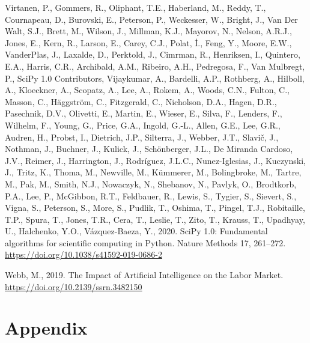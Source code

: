 \documentclass[
  11,
  a4paperpaper,
]{article}
\newlength{\cslhangindent}
\newenvironment{CSLReferences}[2] %
 {\begin{list}{}{%
  \setlength{\itemindent}{0pt}
  \setlength{\leftmargin}{0pt}
  \setlength{\parsep}{0pt}
  \ifodd #1
   \setlength{\leftmargin}{\cslhangindent}
   \setlength{\itemindent}{-1\cslhangindent}
  \fi
  \setlength{\itemsep}{#2\baselineskip}}}
 {\end{list}}
\let\oldsection\section
\renewcommand\section{\clearpage\oldsection}
\begin{document}
\begin{CSLReferences}{1}{0}
Virtanen, P., Gommers, R., Oliphant, T.E., Haberland, M., Reddy, T.,
Cournapeau, D., Burovski, E., Peterson, P., Weckesser, W., Bright, J.,
Van Der Walt, S.J., Brett, M., Wilson, J., Millman, K.J., Mayorov, N.,
Nelson, A.R.J., Jones, E., Kern, R., Larson, E., Carey, C.J., Polat, İ.,
Feng, Y., Moore, E.W., VanderPlas, J., Laxalde, D., Perktold, J.,
Cimrman, R., Henriksen, I., Quintero, E.A., Harris, C.R., Archibald,
A.M., Ribeiro, A.H., Pedregosa, F., Van Mulbregt, P., SciPy 1.0
Contributors, Vijaykumar, A., Bardelli, A.P., Rothberg, A., Hilboll, A.,
Kloeckner, A., Scopatz, A., Lee, A., Rokem, A., Woods, C.N., Fulton, C.,
Masson, C., Häggström, C., Fitzgerald, C., Nicholson, D.A., Hagen, D.R.,
Pasechnik, D.V., Olivetti, E., Martin, E., Wieser, E., Silva, F.,
Lenders, F., Wilhelm, F., Young, G., Price, G.A., Ingold, G.-L., Allen,
G.E., Lee, G.R., Audren, H., Probst, I., Dietrich, J.P., Silterra, J.,
Webber, J.T., Slavič, J., Nothman, J., Buchner, J., Kulick, J.,
Schönberger, J.L., De Miranda Cardoso, J.V., Reimer, J., Harrington, J.,
Rodríguez, J.L.C., Nunez-Iglesias, J., Kuczynski, J., Tritz, K., Thoma,
M., Newville, M., Kümmerer, M., Bolingbroke, M., Tartre, M., Pak, M.,
Smith, N.J., Nowaczyk, N., Shebanov, N., Pavlyk, O., Brodtkorb, P.A.,
Lee, P., McGibbon, R.T., Feldbauer, R., Lewis, S., Tygier, S., Sievert,
S., Vigna, S., Peterson, S., More, S., Pudlik, T., Oshima, T., Pingel,
T.J., Robitaille, T.P., Spura, T., Jones, T.R., Cera, T., Leslie, T.,
Zito, T., Krauss, T., Upadhyay, U., Halchenko, Y.O., Vázquez-Baeza, Y.,
2020. {SciPy} 1.0: Fundamental algorithms for scientific computing in
{Python}. Nature Methods 17, 261--272.
\url{https://doi.org/10.1038/s41592-019-0686-2}

Webb, M., 2019. The {Impact} of {Artificial} {Intelligence} on the
{Labor} {Market}. \url{https://doi.org/10.2139/ssrn.3482150}

\end{CSLReferences}

\newpage{}

\section*{Appendix}\label{sec-appendix}
\end{document}
